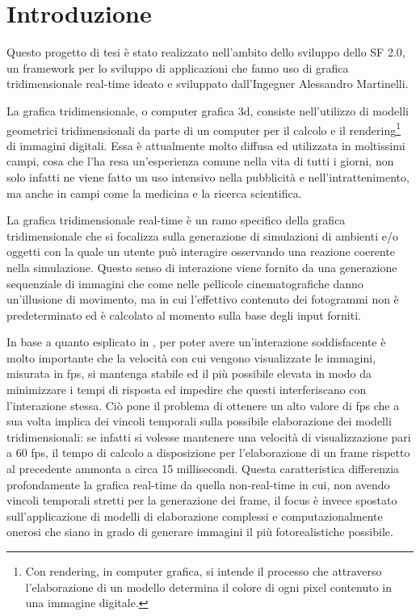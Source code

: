 
\chapter{Introduzione}
\label{ch:introduzione}
Questo progetto di tesi \`e stato realizzato nell'ambito dello sviluppo dello \ac{SF} 2.0, un framework per lo sviluppo di applicazioni che fanno uso di grafica tridimensionale real-time ideato e sviluppato dall'Ingegner Alessandro Martinelli.

La grafica tridimensionale, o computer grafica 3d, consiste nell'utilizzo di modelli geometrici tridimensionali da parte di un computer per il calcolo e il rendering\footnote{Con rendering, in computer grafica, si intende il processo che attraverso l'elaborazione di un modello determina il colore di ogni pixel contenuto in una immagine digitale.\cite{wiki:rendering-it,wiki:rendering-en}} di immagini digitali.
Essa \`e attualmente molto diffusa ed utilizzata in moltissimi campi, cosa che l'ha resa un'esperienza comune nella vita di tutti i giorni, non solo infatti ne viene fatto un uso intensivo nella pubblicit\`a e nell'intrattenimento, ma anche in campi come la medicina e la ricerca scientifica.

La grafica tridimensionale real-time \`e un ramo specifico della grafica tridimensionale che si focalizza sulla generazione di simulazioni di ambienti e/o oggetti con la quale un utente pu\`o interagire osservando una reazione coerente nella simulazione. Questo senso di interazione viene fornito da una generazione sequenziale di immagini che come nelle pellicole cinematografiche danno un'illusione di movimento, ma in cui l'effettivo contenuto dei fotogrammi non \`e predeterminato ed \`e calcolato al momento sulla base degli input forniti.

In base a quanto esplicato in \cite{book:realtimerendering}, per poter avere un'interazione soddisfacente \`e molto importante che la velocit\`a con cui vengono visualizzate le immagini, misurata in \ac{fps}, si mantenga stabile ed il pi\`u possibile elevata in modo da minimizzare i tempi di risposta ed impedire che questi interferiscano con l'interazione stessa.
Ci\`o pone il problema di ottenere un alto valore di \ac{fps} che a sua volta implica dei vincoli temporali sulla possibile elaborazione dei modelli tridimensionali: se infatti si volesse mantenere una velocit\`a di visualizzazione pari a 60 \ac{fps}, il tempo di calcolo a disposizione per l'elaborazione di un frame rispetto al precedente ammonta a circa 15 millisecondi.
Questa caratteristica differenzia profondamente la grafica real-time da quella non-real-time in cui, non avendo vincoli temporali stretti per la generazione dei frame, il focus \`e invece spostato sull'applicazione di modelli di elaborazione complessi e computazionalmente onerosi che siano in grado di generare immagini il pi\`u fotorealistiche possibile. 

